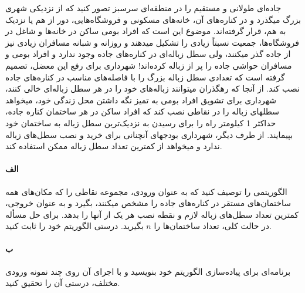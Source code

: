 \documentclass[]{article}
\begin{document}
جاده‌ای طولانی و مستقیم را در منطقه‌ای سرسبز تصور کنید که از نزدیکی شهری بزرگ میگذرد و در کناره‌های آن، خانه‌های مسکونی و فروشگاه‌هایی، دور از هم یا نزدیک به هم، قرار گرفته‌اند.
موضوع این است که افراد بومی ساکن در خانه‌ها و شاغل در فروشگاه‌ها، جمعیت نسبتاً زیادی را تشکیل میدهند و روزانه و شبانه مسافران زیادی نیز از جاده گذر میکنند،
ولی سطل زباله‌ای در کناره‌های جاده وجود ندارد و افراد بومی و مسافران حواشی جاده را پر از زباله کرده‌اند!
شهرداری برای رفع این معضل، تصمیم گرفته است که تعدادی سطل زباله بزرگ را با فاصله‌های مناسب در کناره‌های جاده نصب کند.
از آنجا که رهگذران میتوانند زباله‌های خود را در هر سطل زباله‌ای خالی کنند، شهرداری برای تشویق افراد بومی به تمیز نگه داشتن محل زندگی خود،
میخواهد سطلهای زباله را در نقاطی نصب کند که افراد ساکن در هر ساختمان کناره جاده،
حداکثر 1 کیلومتر راه را برای رسیدن به نزدیک‌ترین سطل زباله به ساختمان خود بپیمایند.
از طرف دیگر، شهرداری بودجهای آنچنانی برای خرید و نصب سطل‌های زباله ندارد و میخواهد از کمترین تعداد سطل زباله ممکن استفاده کند.


\paragraph*{الف}
الگوریتمی را توصیف کنید که به عنوان ورودی، مجموعه نقاطی را که مکان‌های همه ساختمان‌های مستقر در کناره‌های جاده را مشخص میکنند،
بگیرد و به عنوان خروجی، کمترین تعداد سطل‌های زباله لازم و نقطه نصب هر یک از آنها را بدهد.
برای حل مسأله در حالت کلی، تعداد ساختمان‌ها را $n$ بگیرید.
درستی الگوریتم خود را ثابت کنید.

\paragraph*{ب}
برنامه‌ای برای پیاده‌سازی الگوریتم خود بنویسید و با اجرای آن روی چند نمونه ورودی مختلف، درستی آن را تحقیق کنید.
\end{document}
